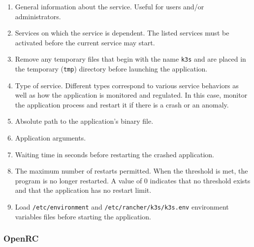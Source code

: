 \begin{enumerate}[label=\protect\circled{\arabic{*}}]
  \item General information about the service.
    \newline
    Useful for users and/or administrators.

  \item Services on which the service is dependent.
    \newline
    The listed services must be activated before the current service may start.

  \item Remove any temporary files that begin with the name \texttt{k3s} and are
    placed in the temporary (\texttt{tmp}) directory before launching the application.

  \item Type of service. Different types correspond to various service behaviors
    as well as how the application is monitored and regulated.
    \newline
    In this case, monitor the application process and restart it if there is a
    crash or an anomaly.

  \item Absolute path to the application's binary file.

  \item Application arguments.

  \item Waiting time in seconds before restarting the crashed application.

  \item The maximum number of restarts permitted. When the threshold is met, the
    program is no longer restarted.
    \newline
    A value of 0 indicates that no threshold exists and that the application has
    no restart limit.

  \item Load \texttt{/etc/environment} and \texttt{/etc/rancher/k3s/k3s.env} environment
    variables files before starting the application.
\end{enumerate}

\clearpage


\subsubsection{OpenRC}
\label{subsec:implementation_distributions_init_system_openrc}

